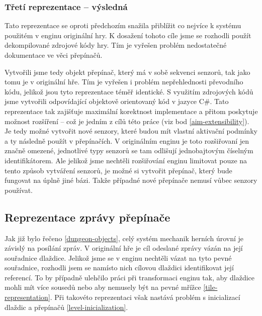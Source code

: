 \subsubsection{Třetí reprezentace -- výsledná}

Tato reprezentace se oproti předchozím snažila přiblížit co nejvíce k systému použitém v enginu originální hry.
K dosažení tohoto cíle jsme se rozhodli použít dekompilované zdrojové kódy \cite{DMDecompilation} hry. Tím
je vyřešen problém nedostatečné dokumentace ve věci přepínačů.

Vytvořili jsme tedy objekt přepínač, který má v sobě sekvenci senzorů, tak jako tomu je v originální hře.
Tím je vyřešen i problém nepřehlednosti převodního kódu, jelikož jsou tyto reprezentace téměř identické.
S využitím zdrojových kódů jsme vytvořili odpovídající objektově orientovaný kód v jazyce C\#. Tato reprezentace
tak zajišťuje maximální korektnost implementace a přitom poskytuje možnost rozšíření -- což je jedním z cílů této práce  (viz bod \ref{aim-extensibility}). 
Je tedy možné vytvořit nové senzory, které budou mít vlastní aktivační podmínky a ty následně použít v přepínačích.
V originálním enginu je toto rozšiřovaní jen značně omezené, jednotlivé typy senzorů se tam odlišují jednobajtovým číselným identifikátorem.
Ale jelikož jsme nechtěli rozšiřování enginu limitovat pouze na tento způsob vytváření senzorů, je možné si vytvořit přepínač, který
bude fungovat na úplně jiné bázi. Takže případné nové přepínače nemusí vůbec senzory používat. 

\subsection{Reprezentace zprávy přepínače}\label{actuator-message-representation}

Jak již bylo řečeno \vref{dungeon-objects}, celý systém mechanik herních úrovní je závislý na posílání zpráv. 
V originální hře je cíl odeslané zprávy vázán na její souřadnice dlaždice. 
Jelikož jsme se v enginu nechtěli vázat na tyto pevné souřadnice, rozhodli jsem se namísto nich
cílovou dlaždici identifikovat její referencí. To by případně ulehčilo práci při transformaci enginu tak, aby
dlaždice mohli mít více sousedů nebo aby nemusely být na pevné mřížce \vref{tile-representation}.
Při takovéto reprezentaci však nastává problém s inicializací dlaždic a přepínačů \vref{level-inicialization}.

